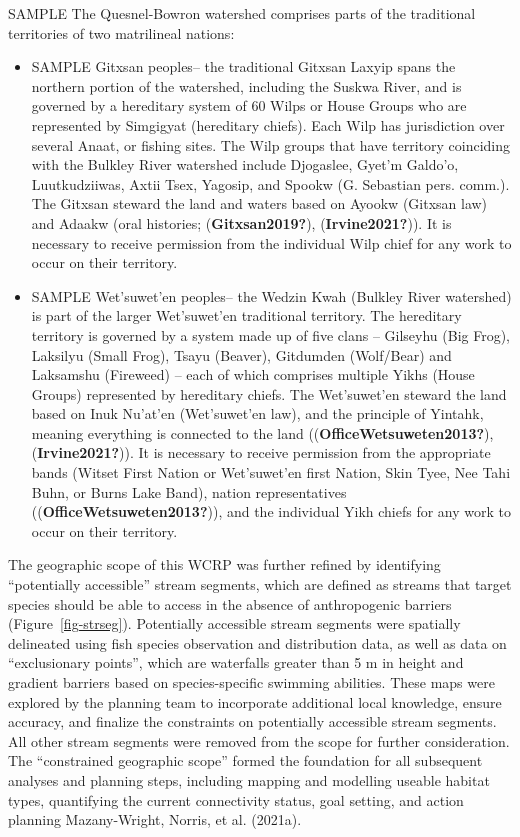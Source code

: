 \documentclass[
  letterpaper,
  DIV=11,
  numbers=noendperiod]{scrreprt}
\begin{document}
SAMPLE The Quesnel-Bowron watershed comprises parts of the traditional
territories of two matrilineal nations:

\begin{itemize}
\item
  SAMPLE Gitxsan peoples-- the traditional Gitxsan Laxyip spans the
  northern portion of the watershed, including the Suskwa River, and is
  governed by a hereditary system of 60 Wilps or House Groups who are
  represented by Simgigyat (hereditary chiefs). Each Wilp has
  jurisdiction over several Anaat, or fishing sites. The Wilp groups
  that have territory coinciding with the Bulkley River watershed
  include Djogaslee, Gyet'm Galdo'o, Luutkudziiwas, Axtii Tsex, Yagosip,
  and Spookw (G. Sebastian pers. comm.). The Gitxsan steward the land
  and waters based on Ayookw (Gitxsan law) and Adaakw (oral histories;
  (\textbf{Gitxsan2019?}), (\textbf{Irvine2021?})). It is necessary to
  receive permission from the individual Wilp chief for any work to
  occur on their territory.
\item
  SAMPLE Wet'suwet'en peoples-- the Wedzin Kwah (Bulkley River
  watershed) is part of the larger Wet'suwet'en traditional territory.
  The hereditary territory is governed by a system made up of five clans
  -- Gilseyhu (Big Frog), Laksilyu (Small Frog), Tsayu (Beaver),
  Gitdumden (Wolf/Bear) and Laksamshu (Fireweed) -- each of which
  comprises multiple Yikhs (House Groups) represented by hereditary
  chiefs. The Wet'suwet'en steward the land based on Inuk Nu'at'en
  (Wet'suwet'en law), and the principle of Yintahk, meaning everything
  is connected to the land ((\textbf{OfficeWetsuweten2013?}),
  (\textbf{Irvine2021?})). It is necessary to receive permission from
  the appropriate bands (Witset First Nation or Wet'suwet'en first
  Nation, Skin Tyee, Nee Tahi Buhn, or Burns Lake Band), nation
  representatives ((\textbf{OfficeWetsuweten2013?})), and the individual
  Yikh chiefs for any work to occur on their territory.
\end{itemize}

The geographic scope of this WCRP was further refined by identifying
``potentially accessible'' stream segments, which are defined as streams
that target species should be able to access in the absence of
anthropogenic barriers (Figure~\ref{fig-strseg}). Potentially accessible
stream segments were spatially delineated using fish species observation
and distribution data, as well as data on ``exclusionary points'', which
are waterfalls greater than 5 m in height and gradient barriers based on
species-specific swimming abilities. These maps were explored by the
planning team to incorporate additional local knowledge, ensure
accuracy, and finalize the constraints on potentially accessible stream
segments. All other stream segments were removed from the scope for
further consideration. The ``constrained geographic scope'' formed the
foundation for all subsequent analyses and planning steps, including
mapping and modelling useable habitat types, quantifying the current
connectivity status, goal setting, and action planning Mazany-Wright,
Norris, et al. (2021a).
\end{document}
